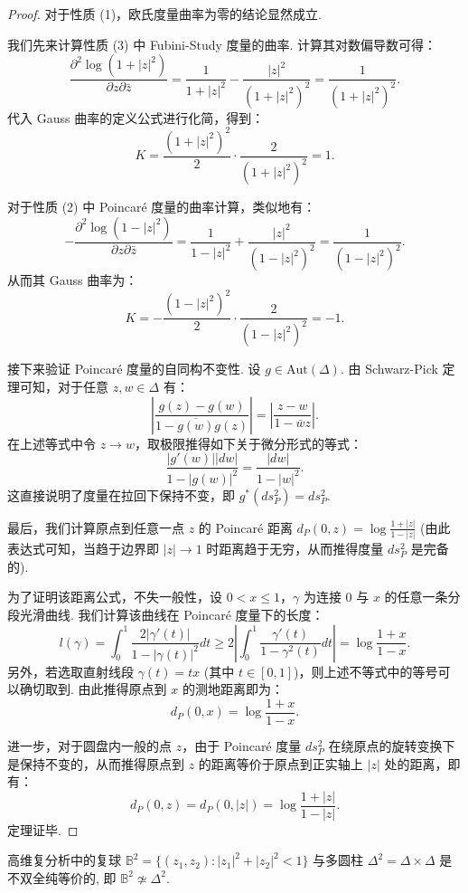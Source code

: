 \begin{proof}
对于性质 (1)，欧氏度量曲率为零的结论显然成立.

我们先来计算性质 (3) 中 Fubini-Study 度量的曲率. 计算其对数偏导数可得：
\[ \frac{\partial^2 \log(1+|z|^2)}{\partial z \partial \bar{z}} = \frac{1}{1+|z|^2} - \frac{|z|^2}{(1+|z|^2)^2} = \frac{1}{(1+|z|^2)^2}. \]
代入 Gauss 曲率的定义公式进行化简，得到：
\[ K = \frac{(1+|z|^2)^2}{2} \cdot \frac{2}{(1+|z|^2)^2} = 1. \]

对于性质 (2) 中 Poincar\'e 度量的曲率计算，类似地有：
\[ -\frac{\partial^2 \log(1-|z|^2)}{\partial z \partial \bar{z}} = \frac{1}{1-|z|^2} + \frac{|z|^2}{(1-|z|^2)^2} = \frac{1}{(1-|z|^2)^2}. \]
从而其 Gauss 曲率为：
\[ K = -\frac{(1-|z|^2)^2}{2} \cdot \frac{2}{(1-|z|^2)^2} = -1. \]

接下来验证 Poincar\'e 度量的自同构不变性. 设 $g \in \mathrm{Aut}(\Delta)$. 由 Schwarz-Pick 定理可知，对于任意 $z, w \in \Delta$ 有：
\[ \left| \frac{g(z)-g(w)}{1-\overline{g(w)}g(z)} \right| = \left| \frac{z-w}{1-\bar{w}z} \right|. \]
在上述等式中令 $z \to w$，取极限推得如下关于微分形式的等式：
\[ \frac{|g'(w)| |dw|}{1-|g(w)|^2} = \frac{|dw|}{1-|w|^2}. \]
这直接说明了度量在拉回下保持不变，即 $g^*(ds_P^2) = ds_P^2$.

最后，我们计算原点到任意一点 $z$ 的 Poincar\'e 距离 $d_P(0, z) = \log \frac{1+|z|}{1-|z|}$ (由此表达式可知，当趋于边界即 $|z| \to 1$ 时距离趋于无穷，从而推得度量 $ds_P^2$ 是完备的).

为了证明该距离公式，不失一般性，设 $0 < x \leqslant 1$，$\gamma$ 为连接 $0$ 与 $x$ 的任意一条分段光滑曲线. 我们计算该曲线在 Poincar\'e 度量下的长度：
\[ l(\gamma) = \int_0^1 \frac{2|\gamma'(t)|}{1-|\gamma(t)|^2} dt \geqslant 2 \left| \int_0^1 \frac{\gamma'(t)}{1-\gamma^2(t)} dt \right| = \log \frac{1+x}{1-x}. \]
另外，若选取直射线段 $\gamma(t) = tx$ (其中 $t \in [0,1]$)，则上述不等式中的等号可以确切取到. 由此推得原点到 $x$ 的测地距离即为：
\[ d_P(0, x) = \log \frac{1+x}{1-x}. \]

进一步，对于圆盘内一般的点 $z$，由于 Poincar\'e 度量 $ds_P^2$ 在绕原点的旋转变换下是保持不变的，从而推得原点到 $z$ 的距离等价于原点到正实轴上 $|z|$ 处的距离，即有：
\[ d_P(0, z) = d_P(0, |z|) = \log \frac{1+|z|}{1-|z|}. \]
定理证毕.
\end{proof}

\begin{theorem}[Poincar\'e 定理]
高维复分析中的复球 $\mathbb{B}^2 = \{(z_1, z_2) : |z_1|^2 + |z_2|^2 < 1\}$ 与多圆柱 $\Delta^2 = \Delta \times \Delta$ 是不双全纯等价的, 即 $\mathbb{B}^2 \not\simeq \Delta^2$.
\end{theorem}


